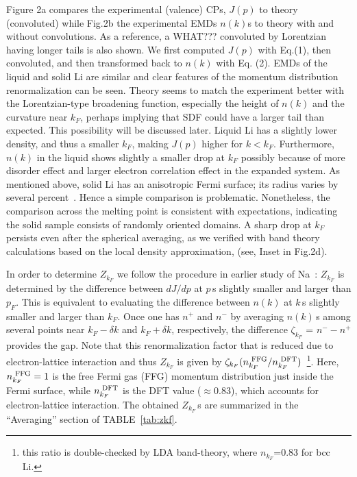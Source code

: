\documentclass[twocolumn,showpacs,showkeys,fleqn,prl,superscriptaddress]{revtex4}%
\newcommand{\nn}[1]{\textnormal{ #1}}
\begin{document}
Figure 2a compares the experimental (valence) CPs, $J(p)$ to theory (convoluted) while Fig.2b the experimental EMDs $n(k)$s to theory with and without convolutions.
As a reference, a WHAT??? convoluted by Lorentzian having longer tails is also shown.
We first computed  $J(p)$ with Eq.(1), then convoluted, and then transformed back to $n(k)$ with Eq. (2).
EMDs of the liquid and solid Li are similar and clear features of the momentum distribution renormalization can be seen.
Theory seems to match the experiment better with the Lorentzian-type broadening function, especially the height of $n(k)$ and the curvature near $k_F$, perhaps implying that SDF could have a larger tail than expected.
This possibility will be discussed later.
Liquid Li has a slightly lower density, and thus a smaller $k_F$, making $J(p)$ higher for $k < k_F$.
Furthermore, $n(k)$ in the liquid shows slightly a smaller drop at $ k_F $  possibly because of more disorder effect and  larger electron correlation effect in the expanded system.
As mentioned above, solid Li has an anisotropic Fermi surface; its radius varies by several percent~\cite{saku95,schulke96}. Hence a simple comparison is problematic.
Nonetheless, the comparison across the melting point is consistent with expectations, indicating the solid sample consists of randomly oriented domains.
A sharp drop at $k_F$ persists even after the spherical averaging, as we verified with band theory  calculations based on the local density approximation, (see, Inset in Fig.2d).

In order to determine $Z_{k_F}$ we follow the procedure in earlier study of Na~\cite{simo10}: $Z_{k_F}$ is determined by the difference between $dJ/dp$ at $p\,$s slightly smaller and larger than $p_F$.
This is equivalent to evaluating the difference between $n(k)$ at $k\,$s slightly smaller and larger than $k_F$.
Once one has $n^+$ and $n^-$ by averaging $n(k)$\,s among several points near $k_F-\delta k$ and  $k_F+\delta k$, respectively, the difference $\zeta_{k_F}$ = $n^- - n^+$ provides the gap.
Note that this renormalization factor that is reduced due to electron-lattice interaction and thus
$Z_{k_F}$ is given by $\zeta_{k_F} (n_{k_F}^{\nn{FFG}}/n_{k_F}^{\nn{DFT}})$~\footnote{this ratio is double-checked by LDA band-theory, where $n_{k_F}$=0.83 for bcc Li.}.
Here, $n_{k_F}^{\nn{FFG}}=1$ is the free Fermi gas (FFG) momentum distribution just inside the Fermi surface, while $n_{k_F}^{\nn{DFT}}$ is the DFT value ($\approx$0.83), which accounts for electron-lattice interaction. 
The obtained $Z_{k_F}\,$s are summarized in the ``Averaging'' section of TABLE~\ref{tab:zkf}.
\end{document}
